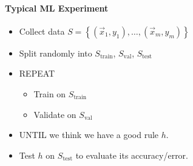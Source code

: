 \paragraph{Typical ML Experiment}
\begin{itemize}
    \item Collect data $S = \left\{ \left( \vec{x}_1, y_1 \right), \ldots, \left( \vec{x}_m, y_m \right) \right\}$
    \item Split randomly into $S_{\text{train}}$, $S_{\text{val}}$, $S_{\text{test}}$
    \item REPEAT
    \begin{itemize}
        \item Train on $S_{\text{train}}$
        \item Validate on $S_{\text{val}}$
    \end{itemize}
    \item UNTIL we think we have a good rule $h$.
    \item Test $h$ on $S_{\text{test}}$ to evaluate its accuracy/error.
\end{itemize}

